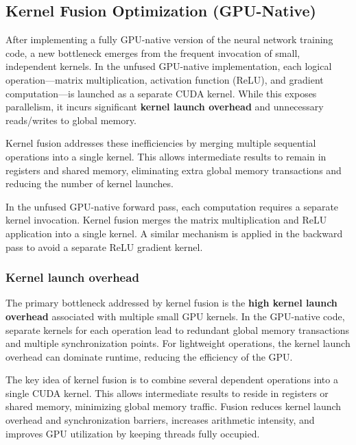 \documentclass[conference, 12pt]{IEEEtran}
\begin{document}
\subsection{Kernel Fusion Optimization (GPU-Native)}
After implementing a fully GPU-native version of the neural network training code, a new bottleneck emerges from the frequent invocation of small, independent kernels. In the unfused GPU-native implementation, each logical operation—matrix multiplication, activation function (ReLU), and gradient computation—is launched as a separate CUDA kernel. While this exposes parallelism, it incurs significant \textbf{kernel launch overhead} and unnecessary reads/writes to global memory.

Kernel fusion addresses these inefficiencies by merging multiple sequential operations into a single kernel. This allows intermediate results to remain in registers and shared memory, eliminating extra global memory transactions and reducing the number of kernel launches.

In the unfused GPU-native forward pass, each computation requires a separate kernel invocation. Kernel fusion merges the matrix multiplication and ReLU application into a single kernel. A similar mechanism is applied in the backward pass to avoid a separate ReLU gradient kernel.


\subsubsection{Kernel launch overhead}
The primary bottleneck addressed by kernel fusion is the \textbf{high kernel launch overhead} associated with multiple small GPU kernels. In the GPU-native code, separate kernels for each operation lead to redundant global memory transactions and multiple synchronization points. For lightweight operations, the kernel launch overhead can dominate runtime, reducing the efficiency of the GPU.

The key idea of kernel fusion is to combine several dependent operations into a single CUDA kernel. This allows intermediate results to reside in registers or shared memory, minimizing global memory traffic. Fusion reduces kernel launch overhead and synchronization barriers, increases arithmetic intensity, and improves GPU utilization by keeping threads fully occupied.
\end{document}
